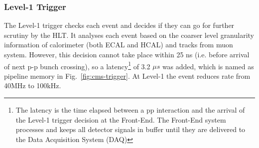 \subsubsection{Level-1 Trigger} %
\label{ssub:level_1_trigger}
The Level-1 trigger checks each event and decides if they can go for further scrutiny by the HLT.
It analyses each event based on the coarser level granularity information of calorimeter (both ECAL and HCAL) and tracks from muon system.
However, this decision cannot take place within 25 ns (i.e. before arrival of next p-p bunch crossing), so a latency\footnote{The latency is the time elapsed between a pp interaction and the arrival of the Level-1 trigger decision at the Front-End. The Front-End system processes and keeps all detector signals in buffer until they are delivered to the Data Acquisition System (DAQ)} of 3.2 $\mu s$ was added, which is named as pipeline memory in Fig.~\ref{fig:cms-trigger}.
At Level-1 the event reduces rate from 40MHz to 100kHz.

